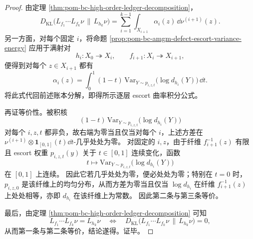 \begin{proof}
由定理 \ref{thm:pom-bc-high-order-ledger-decomposition}，
\[
D_{\mathrm{KL}}\!\bigl(L_{f_1}\cdots L_{f_k}\nu\,\|\,L_{h_k}\nu\bigr)
=
\sum_{i=1}^{k-1}
\int_{X_{i+1}}\alpha_i(z)\,\dd \nu^{(i+1)}(z).
\]
另一方面，对每个固定 \(i\)，将命题
\ref{prop:pom-bc-amgm-defect-escort-variance-energy}
应用于满射对
\[
h_i:X_0\twoheadrightarrow X_i,
\qquad
f_{i+1}:X_i\twoheadrightarrow X_{i+1},
\]
便得到对每个 \(z\in X_{i+1}\) 都有
\[
\alpha_i(z)
=
\int_0^1
(1-t)\,
\mathrm{Var}_{Y\sim p_{i,z,t}}\!\bigl(\log d_{h_i}(Y)\bigr)\,
\dd t.
\]
将此式代回前述账本分解，即得所示逐层 escort 曲率积分公式。

再证等价性。被积核
\[
(1-t)\,
\mathrm{Var}_{Y\sim p_{i,z,t}}\!\bigl(\log d_{h_i}(Y)\bigr)
\]
对每个 \(i,z,t\) 都非负，故右端为零当且仅当对每个 \(i\)，上述方差在
\(\nu^{(i+1)}\otimes \mathbf 1_{[0,1]}(t)\dd t\)-几乎处处为零。
对固定的 \(i,z\)，由于纤维 \(f_{i+1}^{-1}(z)\) 有限且 escort 权重
\(p_{i,z,t}(y)\) 关于 \(t\in[0,1]\) 连续变化，函数
\[
t\longmapsto \mathrm{Var}_{Y\sim p_{i,z,t}}\!\bigl(\log d_{h_i}(Y)\bigr)
\]
在 \([0,1]\) 上连续。
因此它若几乎处处为零，便必处处为零；特别在 \(t=0\) 时，\(p_{i,z,0}\) 是该纤维上的均匀分布，从而方差为零当且仅当 \(\log d_{h_i}\) 在纤维 \(f_{i+1}^{-1}(z)\) 上处处相等，亦即 \(d_{h_i}\) 在该纤维上为常数。
因此第二条与第三条等价。

最后，由定理 \ref{thm:pom-bc-high-order-ledger-decomposition} 可知
\[
L_{f_1}\cdots L_{f_k}\nu=L_{h_k}\nu
\quad\Longleftrightarrow\quad
D_{\mathrm{KL}}\!\bigl(L_{f_1}\cdots L_{f_k}\nu\,\|\,L_{h_k}\nu\bigr)=0,
\]
从而第一条与第二条等价，结论遂得。证毕。
\end{proof}

\endinput
